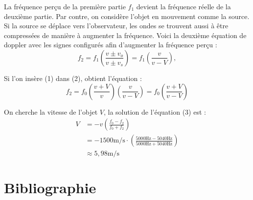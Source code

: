 \documentclass[11pt]{article}
\begin{document}
La fréquence perçu de la première partie $f_1$ devient la fréquence réelle de la deuxième partie. Par contre, on considère l'objet en mouvement comme la source. Si la source se déplace vers l'observateur, les ondes se trouvent aussi à être compressées de manière à augmenter la fréquence. Voici la deuxième équation de doppler avec les signes configurés afin d'augmenter la fréquence perçu :
\begin{equation}
f_2=f_1\left(\frac{v\pm v_o}{v\pm v_s}\right)=f_1\left(\frac{v}{v-V}\right),
\end{equation}

Si l'on insère (1) dans (2), obtient l'équation :
\begin{equation}
f_2=f_0\left(\frac{v+V}{v}\right)\left(\frac{v}{v-V}\right)=f_0\left(\frac{v+V}{v-V}\right)
\end{equation}

On cherche la vitesse de l'objet $V$, la solution de l'équation (3) est :
\begin{equation}
\begin{split}
V&=-v\left(\frac{f_0-f_2}{f_0+f_2}\right)\\
 &=-1500\mathrm{m/s}\cdot\left(\frac{5000\mathrm{Hz}-5040\mathrm{Hz}}{5000\mathrm{Hz}+5040\mathrm{Hz}}\right)\\
 &\approx5,98\mathrm{m/s}
\end{split}
\end{equation}

\section*{Bibliographie}

\renewcommand{\section}[2]{}

\end{document}
